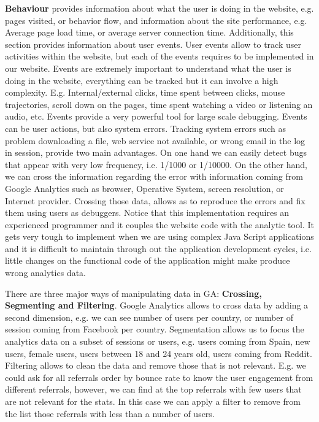 \documentclass{article}
\begin{document}
\textbf{Behaviour} provides information about what the user is doing in the website, e.g. pages visited, or behavior flow, and information about the site performance, e.g. Average page load time, or average server connection time. Additionally, this section provides information about user events. User events allow to track user activities within the website, but each of the events requires to be implemented in our website. Events are extremely important to understand what the user is doing in the website, everything can be tracked but it can involve a high complexity. E.g. Internal/external clicks, time spent between clicks, mouse trajectories, scroll down on the pages, time spent watching a video or listening an audio, etc. Events provide a very powerful tool for large scale debugging. Events can be user actions, but also system errors. Tracking system errors such as problem downloading a file, web service not available, or wrong email in the log in session, provide two main advantages. On one hand we can easily detect bugs that appear with very low frequency, i.e. 1/1000 or 1/10000. On the other hand, we can cross the information regarding the error with information coming from Google Analytics such as browser, Operative System, screen resolution, or Internet provider. Crossing those data, allows as to reproduce the errors and fix them using users as debuggers. Notice that this implementation requires an experienced programmer and it couples the website code with the analytic tool. It gets very tough to implement when we are using complex Java Script applications and it is difficult to maintain through out the application development cycles, i.e. little changes on the functional code of the application might make produce wrong analytics data.  

   
  
 
There are three major ways of manipulating data in GA: \textbf{Crossing, Segmenting and Filtering}. Google Analytics allows to cross data by adding a second dimension, e.g. we can see number of users per country, or number of session coming from Facebook per country. Segmentation allows us to focus the analytics data on a subset of sessions or users, e.g. users coming from Spain, new users, female users, users between 18 and 24 years old, users coming from Reddit. Filtering allows to clean the data and remove those that is not relevant. E.g. we could ask for all referrals order by bounce rate to know the user engagement from different referrals, however, we can find at the top referrals with few users that are not relevant for the stats. In this case we can apply a filter to remove from the list those referrals with less than a number of users. 
\end{document}
